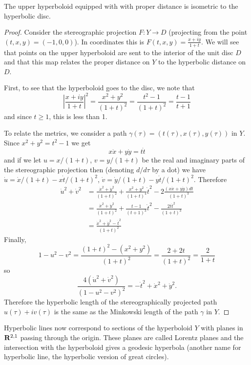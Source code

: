 \documentclass[12pt]{article}
\begin{document}
\begin{thm}
  The upper hyperboloid equipped with with proper distance is isometric to the hyperbolic disc.
\end{thm}
\begin{proof}
  Consider the stereographic projection $F\colon Y\to D$ (projecting from the point $(t,x,y)=(-1,0,0)$). In coordinates this is $F(t,x,y)=\frac{x+iy}{1+t}$. We will see that points on the upper hyperboloid are sent to the interior of the unit disc $D$ and that this map relates the proper distance on $Y$ to the hyperbolic distance on $D$.

  First, to see that the hyperboloid goes to the disc, we note that
  \[\left|\frac{x+iy}{1+t}\right|^2=\frac{x^2+y^2}{(1+t)^2}=\frac{t^2-1}{(1+t)^2}=\frac{t-1}{t+1}\]
  and since $t\geq 1$, this is less than 1.

  To relate the metrics, we consider a path $\gamma(\tau)=(t(\tau),x(\tau),y(\tau))$ in $Y$. Since $x^2+y^2=t^2-1$ we get
  \[x\dot{x}+y\dot{y}=t\dot{t}\]
  and if we let $u=x/(1+t)$, $v=y/(1+t)$ be the real and imaginary parts of the stereographic projection then (denoting $d/d\tau$ by a dot) we have $\dot{u}=\dot{x}/(1+t)-x\dot{t}/(1+t)^2$, $\dot{v}=\dot{y}/(1+t)-y\dot{t}/(1+t)^2$. Therefore
  \begin{align*}
    \dot{u}^2+\dot{v}^2&=\frac{\dot{x}^2+\dot{y}^2}{(1+t)^2}+\frac{x^2+y^2}{(1+t)^4}\dot{t}^2-2\frac{(x\dot{x}+y\dot{y})dt}{(1+t)^3}\\
    &=\frac{\dot{x}^2+\dot{y}^2}{(1+t)^2}+\frac{t-1}{(t+1)^3}\dot{t}^2-\frac{2t\dot{t}^2}{(1+t)^3}\\
    &=\frac{\dot{x}^2+\dot{y}^2-\dot{t}^2}{(1+t)^2}
  \end{align*}
  Finally,
  \[1-u^2-v^2=\frac{(1+t)^2-(x^2+y^2)}{(1+t)^2}=\frac{2+2t}{(1+t)^2}=\frac{2}{1+t}\]
  so
  \[\frac{4(\dot{u}^2+\dot{v}^2)}{(1-u^2-v^2)^2}=-\dot{t}^2+\dot{x}^2+\dot{y}^2.\]
  Therefore the hyperbolic length of the stereographically projected path $u(\tau)+iv(\tau)$ is the same as the Minkowski length of the path $\gamma$ in $Y$.
\end{proof}

Hyperbolic lines now correspond to sections of the hyperboloid $Y$ with planes in $\mathbf{R}^{2,1}$ passing through the origin. These planes are called Lorentz planes and the intersection with the hyperboloid gives a geodesic hyperbola (another name for hyperbolic line, the hyperbolic version of great circles).
\end{document}
